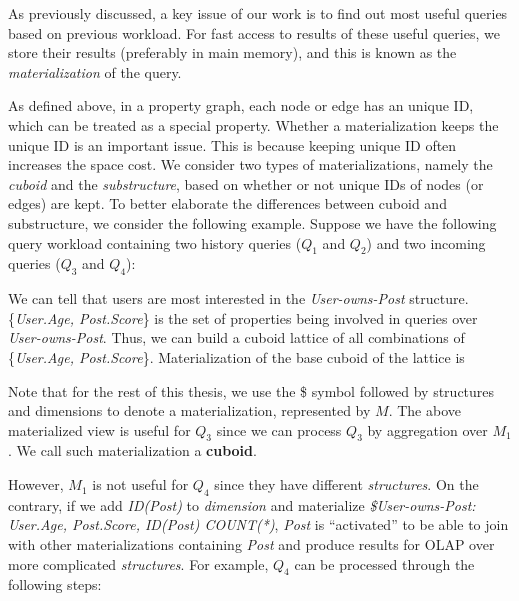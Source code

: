As previously discussed, a key issue of our work is to find out most useful queries based on previous workload. For fast access to results of these useful queries, we store their results (preferably in main memory), and this is known as the \textit{materialization} of the query. 

As defined above, in a property graph, each node or edge has an unique ID, which can be treated as a special property. Whether a materialization keeps the unique ID is an important issue. This is because keeping unique ID often increases the space cost. We consider two types of materializations, namely the \emph{cuboid} and the \emph{substructure}, based on whether or not unique IDs of nodes (or edges) are kept. To better elaborate the differences between cuboid and substructure, we consider the following example. Suppose we have the following query workload containing two history queries ($Q_1$ and $Q_2$) and two incoming queries ($Q_3$ and $Q_4$):







%
%

We can tell that users are most interested in  the \textit{User-owns-Post} structure. \{\emph{User.Age, Post.Score}\} is the set of properties being involved in queries over \textit{User-owns-Post}. Thus, we can build a cuboid lattice of all combinations of  \{\emph{User.Age, Post.Score}\}. Materialization of the base cuboid of the lattice is


\noindent Note that for the rest of this thesis, we use the \$ symbol followed by structures and dimensions to denote a materialization, represented by $M$. The above materialized view is useful for $Q_3$ since we can process $Q_3$ by aggregation over $M_1$. We call such materialization a \textbf{cuboid}.


However, $M_1$ is not useful for $Q_4$ since they have different \textit{structures}. On the contrary, if we add \textit{ID(Post)} to \textit{dimension} and materialize \textit{\$User-owns-Post: User.Age, Post.Score, ID(Post) COUNT(*)}, \textit{Post} is ``activated'' to be able to join with other materializations containing \textit{Post} and produce results for OLAP over more complicated \textit{structures}. For example, $Q_4$ can be processed through the following steps:


